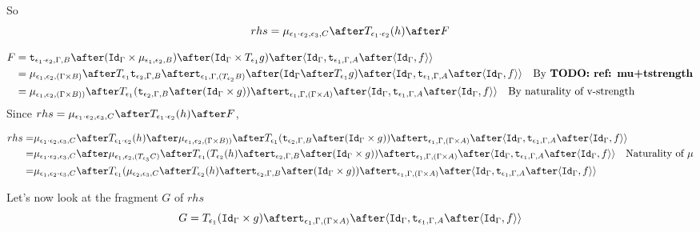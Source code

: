 \documentclass{report}
\begin{document}
So 
\begin{equation}
    rhs = \bind{\e_1\dot\e_2}{\e_3}{C}\after\T{\e_1\dot\e_2}{(h)}\after F
\end{equation}

\begin{equation}
    \begin{split}
        F & = \tstrength{\e_1\dot\e_2}{\G}{B}\after(\idg\times\bind{\e_1}{\e_2}{B})\after(\idg\times\T{\e_1}{g})\after\pr{\idg}{\tstrength{\e_1}{\G}{A}\after\pr{\idg}{f}}\\
        &  = \bind{\e_1}{\e_2}{(\G\times B)} \after \T{\e_1}{\tstrength{\e_2}{\G}{B}} \after\tstrength{\e_1}{\G}{(\T{\e_2}{B})} \after (\idg \after\T{\e_1}{g})\after\pr{\idg}{\tstrength{\e_1}{\G}{A}\after\pr{\idg}{f}}\qt{By \todo{ref: mu+tstrength}}
        \\ & = \bind{\e_1}{\e_2}{(\G \times B))} \after \T{\e_1}{(\tstrength{\e_2}{\G}{B} \after (\idg \times g))} \after \tstrength{\e_1}{\G}{(\G \times A)} \after \pr{\idg}{\tstrength{\e_1}{\G}{A}\after\pr{\idg}{f}}\qt{By naturality of v-strength}
    \end{split}
\end{equation}
Since
$
    rhs = \bind{\e_1\dot\e_2}{\e_3}{C}\after\T{\e_1\dot\e_2}{(h)}\after F
$, 

\begin{equation}
    \begin{split}
        rhs = &\bind{\e_1\dot\e_2}{\e_3}{C}\after\T{\e_1\dot\e_2}{(h)}\after\bind{\e_1}{\e_2}{(\G \times B))} \after \T{\e_1}{(\tstrength{\e_2}{\G}{B} \after (\idg \times g))} \after \tstrength{\e_1}{\G}{(\G \times A)} \after \pr{\idg}{\tstrength{\e_1}{\G}{A}\after\pr{\idg}{f}}\\
        = &\bind{\e_1\dot\e_2}{\e_3}{C}\after\bind{\e_1}{\e_2}{(\T{\e_3}{C})}\after\T{\e_1}{(\T{\e_2}{(h)} \after \tstrength{\e_2}{\G}{B} \after (\idg \times g))} \after \tstrength{\e_1}{\G}{(\G \times A)} \after \pr{\idg}{\tstrength{\e_1}{\G}{A}\after\pr{\idg}{f}}\qt{Naturality of $\mu$}\\
        = & \bind{\e_1}{\e_2\dot\e_3}{C}\after\T{\e_1}{(\bind{\e_2}{\e_3}{C}\after \T{\e_2}{(h)} \after \tstrength{\e_2}{\G}{B} \after (\idg \times g))} \after \tstrength{\e_1}{\G}{(\G \times A)} \after \pr{\idg}{\tstrength{\e_1}{\G}{A}\after\pr{\idg}{f}}
    \end{split}
\end{equation}

Let's now look at the fragment $G$ of $rhs$
\begin{equation}
    G = \T{\e_1}{(\idg\times g)}\after\tstrength{\e_1}{\G}{(\G\times A)}\after\pr{\idg}{\tstrength{\e_1}{\G}{A}\after\pr{\idg}{f}}
\end{equation}
\end{document}
